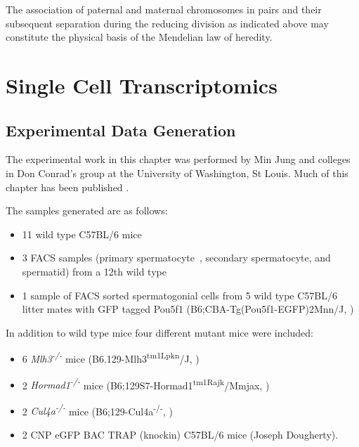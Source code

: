 \begin{savequote}[8cm]
The association of paternal and maternal chromosomes in pairs and their subsequent separation during the reducing division as indicated above may constitute the physical basis of the Mendelian law of heredity.
\end{savequote}

\chapter{\label{ch:2-SDA} Single Cell Transcriptomics}

\minitoc

\section{Experimental Data Generation}

The experimental work in this chapter was performed by Min Jung and colleges in Don Conrad's group at the University of Washington, St Louis. Much of this chapter has been published \parencite{Jung2019Unified}.

The samples generated are as follows:

\begin{itemize}
	\item 11 wild type C57BL/6 mice
	\item 3 FACS samples (primary spermatocyte , secondary spermatocyte, and spermatid) from a 12th wild type
	\item 1 sample of FACS sorted spermatogonial cells from 5 wild type C57BL/6 litter mates with GFP tagged Pou5f1 (B6;CBA-Tg(Pou5f1-EGFP)2Mnn/J, \cite{Szabo2002Allelespecific})
\end{itemize}

In addition to wild type mice four different mutant mice were included:
\begin{itemize}
	\item 6 \textit{Mlh3\textsuperscript{-/-}} mice (B6.129-Mlh3\textsuperscript{tm1Lpkn}/J, \cite{Lipkin2002Meiotic})
	\item 2 \textit{Hormad1\textsuperscript{-/-}} mice (B6;129S7-Hormad1\textsuperscript{tm1Rajk}/Mmjax, \cite{Shin2010Hormad1})
	\item 2 \textit{Cul4a\textsuperscript{-/-}} mice (B6;129-Cul4a\textsuperscript{-/-}, \cite{Yin2011E3})
	\item 2 CNP eGFP BAC TRAP (knockin) C57BL/6 mice (Joseph Dougherty).
\end{itemize}

